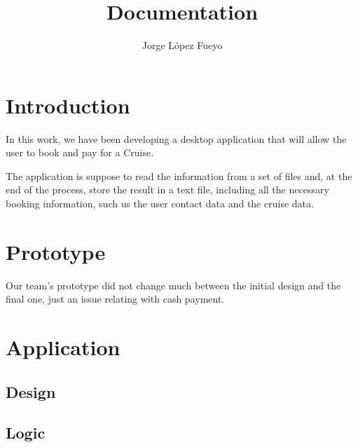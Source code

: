 \documentclass{article}
\title{Documentation}
\author{Jorge López Fueyo}
\begin{document}
   \maketitle
   \newpage
     
   \section{Introduction}
   
   In this work, we have been developing a desktop application that will allow the user to book and pay for a Cruise.

   The application is suppose to read the information from a set of files and, at the end of the process, store the result in a text file, including all the necessary booking information, such us the user contact data and the cruise data.
   
   \section{Prototype}
   Our team's prototype did not change much between the initial design and the final one, just an issue relating with cash payment.
   
   \section{Application}
   \subsection{Design}
   \subsection{Logic}
\end{document}
